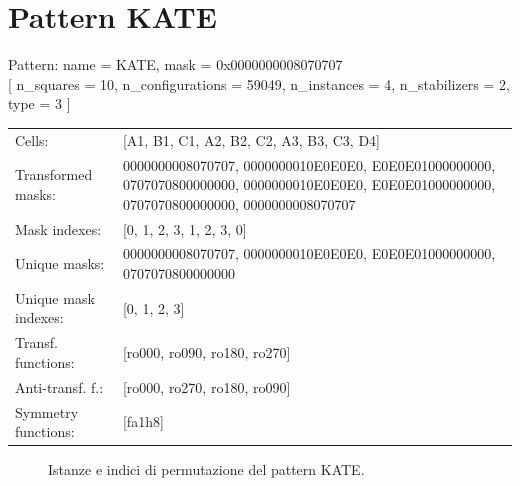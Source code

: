 \newpage

\section{Pattern KATE}

\begin{tcolorbox}[sharp corners, fontupper=\ttfamily\small, colback=white]
  \noindent Pattern: name = KATE, mask = 0x0000000008070707\\
  {[} n\_squares = 10, n\_configurations = 59049,
  n\_instances = 4, n\_stabilizers = 2, type = 3 { ]}\\[1.0ex]
  \begin{tabularx}{\textwidth}{@{} p{3.5cm} X @{}}
    Cells:               & {[}A1, B1, C1, A2, B2, C2, A3, B3, C3, D4{]}\\[0.5ex]
    Transformed masks:   & 0000000008070707, 0000000010E0E0E0, E0E0E01000000000, 0707070800000000, 0000000010E0E0E0, E0E0E01000000000, 0707070800000000, 0000000008070707\\[0.5ex]
    Mask indexes:        & {[}0, 1, 2, 3, 1, 2, 3, 0{]}\\[0.5ex]
    Unique masks:        & 0000000008070707, 0000000010E0E0E0, E0E0E01000000000, 0707070800000000\\[0.5ex]
    Unique mask indexes: & {[}0, 1, 2, 3{]}\\[0.5ex]
    Transf. functions:   & {[}ro000, ro090, ro180, ro270{]}\\[0.5ex]
    Anti-transf. f.:     & {[}ro000, ro270, ro180, ro090{]}\\[0.5ex]
    Symmetry functions:  & {[}fa1h8{]}\\[0.5ex]
  \end{tabularx}
\end{tcolorbox}

\begin{figure}[htbp]
  \centering
   \hfill
   \hfill
   \hfill
  \vspace{0.3cm}
   \hfill
   \hfill
   \hfill
  \caption{Istanze e indici di permutazione del pattern KATE.}
\end{figure}

